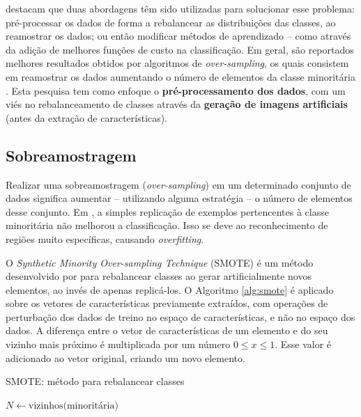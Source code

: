 
\cite{Castro2011} destacam que duas abordagens têm sido utilizadas para solucionar esse problema: pré-processar os dados de forma a rebalancear as distribuições das classes, ao reamostrar os dados; ou então modificar métodos de aprendizado -- como através da adição de melhores funções de custo na classificação. Em geral, são reportados melhores resultados obtidos por algoritmos de \textit{over-sampling}, os quais consistem em reamostrar os dados aumentando o número de elementos da classe minoritária \cite{Batista2004}. Esta pesquisa tem como enfoque o \textbf{pré-processamento dos dados}, com um viés no rebalanceamento de classes através da \textbf{geração de imagens artificiais} (antes da extração de características).

\subsection{Sobreamostragem}
\label{sec:smote}

Realizar uma sobreamostragem (\textit{over-sampling}) em um determinado conjunto de dados significa aumentar -- utilizando alguma estratégia -- o número de elementos desse conjunto. Em , a simples replicação de exemplos pertencentes à classe minoritária não melhorou a classificação. Isso se deve ao reconhecimento de regiões muito específicas, causando \textit{overfitting}.

O \textit{Synthetic Minority Over-sampling Technique} (SMOTE) é um método desenvolvido por  para rebalancear classes ao gerar artificialmente novos elementos, ao invés de apenas replicá-los. O Algoritmo \ref{alg:smote} é aplicado sobre os vetores de características previamente extraídos, com operações de perturbação dos dados de treino no espaço de características, e não no espaço dos dados. A diferença entre o vetor de características de um elemento e do seu vizinho mais próximo é multiplicada por um número $0 \le  x \le 1$. Esse valor é adicionado ao vetor original, criando um novo elemento.

\begin{algorithm}[!htbp]
  \caption{SMOTE: método para rebalancear classes}
  \label{alg:smote}
  \SetAlgoLined
  $N \gets \text{vizinhos(minoritária)}$\;
\end{algorithm}

